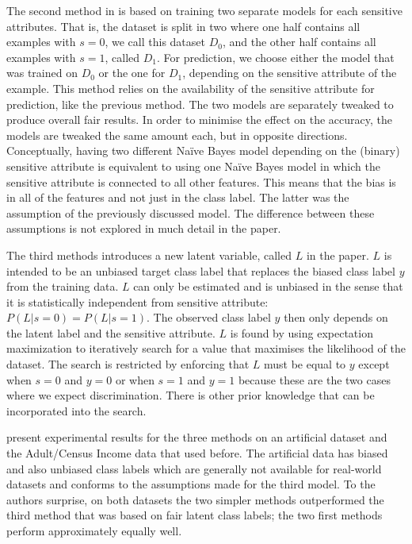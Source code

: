 The second method in \citet{calders2010three}
is based on training two separate models for each sensitive attributes.
That is, the dataset is split in two
where one half contains all examples with \(s=0\), we call this dataset \(D_0\),
and the other half contains all examples with \(s=1\), called \(D_1\).
For prediction, we choose either the model that was trained on \(D_0\) or the one for \(D_1\),
depending on the sensitive attribute of the example.
This method relies on the availability of the sensitive attribute for prediction,
like the previous method.
The two models are separately tweaked to produce overall fair results.
In order to minimise the effect on the accuracy, the models are tweaked the same amount each,
but in opposite directions.
Conceptually, having two different Na\"ive Bayes model depending on the (binary) sensitive attribute
is equivalent to using one Na\"ive Bayes model
in which the sensitive attribute is connected to all other features.
This means that the bias is in all of the features and not just in the class label.
The latter was the assumption of the previously discussed model.
The difference between these assumptions is not explored in much detail in the paper.

The third methods introduces a new latent variable, called \(L\) in the paper.
\(L\) is intended to be an unbiased target class label
that replaces the biased class label \(y\) from the training data.
\(L\) can only be estimated and is unbiased
in the sense that it is statistically independent from sensitive attribute: \(P(L|s=0) = P(L|s=1)\).
The observed class label \(y\) then only depends on the latent label and the sensitive attribute.
\(L\) is found by using expectation maximization
to iteratively search for a value that maximises the likelihood of the dataset.
The search is restricted by enforcing that \(L\) must be equal to \(y\) except
when \(s=0\) and \(y=0\) or when \(s=1\) and \(y=1\)
because these are the two cases where we expect discrimination.
There is other prior knowledge that can be incorporated into the search.

\citet{calders2010three} present experimental results for the three methods on an artificial dataset
and the Adult/Census Income data that \citet{calders2009building} used before.
The artificial data has biased and also unbiased class labels
which are generally not available for real-world datasets
and conforms to the assumptions made for the third model.
To the authors surprise, on both datasets the two simpler methods outperformed the third method
that was based on fair latent class labels;
the two first methods perform approximately equally well.


